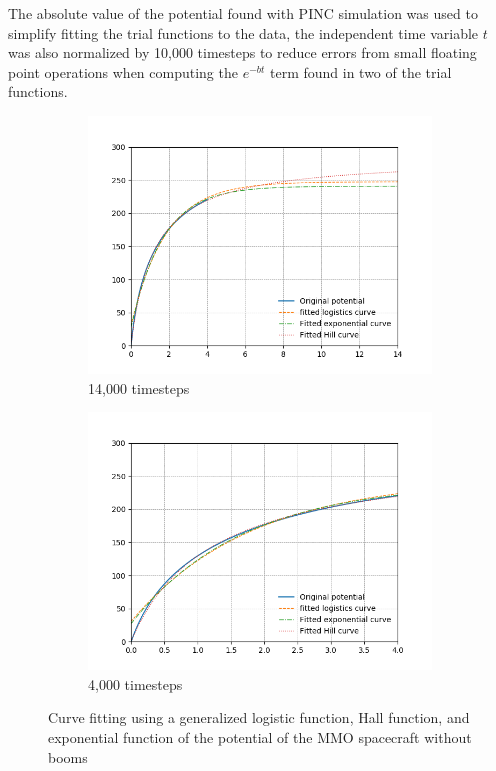 The absolute value of the potential found with PINC simulation was used to simplify fitting the trial functions to the data, the independent time variable $t$ was also normalized by 10,000 timesteps to reduce errors from small floating point operations when computing the $e^{-b t}$ term found in two of the trial functions.
\begin{center}
\begin{figure}[H]
  \begin{subfigure}[b]{0.61\textwidth}
    \includegraphics[width=\textwidth]{figures/Appendix/C_fit_NB.png}
    \caption{14,000 timesteps}
    \label{fig:C_fit_NB}
  \end{subfigure}
  \hfill
  \begin{subfigure}[b]{0.61\textwidth}
    \includegraphics[width=\textwidth]{figures/Appendix/C_fit_NB_lim.png}
    \caption{4,000 timesteps}
    \label{fig:C_fit_NB_lim}
  \end{subfigure}
  \label{fig:Pot_noPH}
  \caption{Curve fitting using a generalized logistic function, Hall function, and exponential function of the potential of the MMO spacecraft without booms}
\end{figure}
\end{center}


